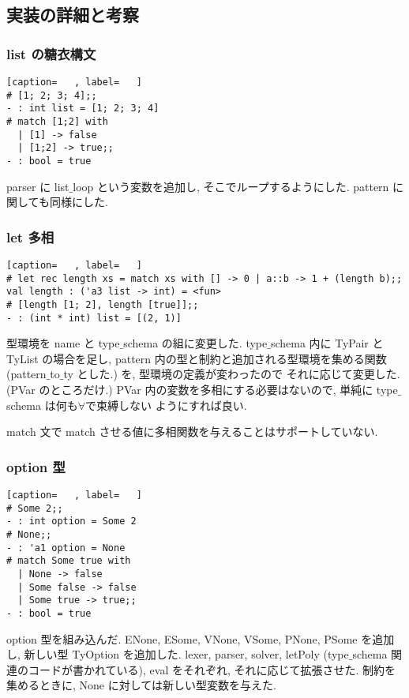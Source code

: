 \documentclass[dvipdfmx]{jsarticle}
\begin{document}
\subsection*{実装の詳細と考察}

\subsubsection*{list の糖衣構文}
\begin{lstlisting}[caption=   , label=   ]
# [1; 2; 3; 4];;
- : int list = [1; 2; 3; 4]
# match [1;2] with
  | [1] -> false
  | [1;2] -> true;;
- : bool = true
\end{lstlisting}
parser に list$\_$loop という変数を追加し, そこでループするようにした.
pattern に関しても同様にした.


\subsubsection*{let 多相}
\begin{lstlisting}[caption=   , label=   ]
# let rec length xs = match xs with [] -> 0 | a::b -> 1 + (length b);;
val length : ('a3 list -> int) = <fun>
# [length [1; 2], length [true]];;
- : (int * int) list = [(2, 1)]
\end{lstlisting}
型環境を name と type$\_$schema の組に変更した.
type$\_$schema 内に TyPair と TyList の場合を足し,
pattern 内の型と制約と追加される型環境を集める関数 (pattern$\_$to$\_$ty とした.) を, 型環境の定義が変わったので
それに応じて変更した. (PVar のところだけ.) PVar 内の変数を多相にする必要はないので, 単純に type$\_$schema は何も$\forall$で束縛しない
ようにすれば良い.

match 文で match させる値に多相関数を与えることはサポートしていない.


\subsubsection*{option 型}
\begin{lstlisting}[caption=   , label=   ]
# Some 2;;
- : int option = Some 2
# None;;
- : 'a1 option = None
# match Some true with
  | None -> false
  | Some false -> false
  | Some true -> true;;
- : bool = true
\end{lstlisting}
option 型を組み込んだ.
ENone, ESome, VNone, VSome, PNone, PSome を追加し,
新しい型 TyOption を追加した.
lexer, parser, solver, letPoly (type$\_$schema 関連のコードが書かれている), eval をそれぞれ, それに応じて拡張させた.
制約を集めるときに, None に対しては新しい型変数を与えた.
\end{document}
